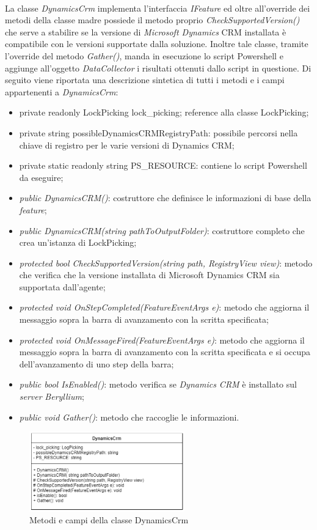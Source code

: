 \\
La classe \emph{DynamicsCrm} implementa l'interfaccia \emph{IFeature} ed oltre all'override dei metodi della classe madre possiede il metodo proprio \emph{CheckSupportedVersion()} che serve a stabilire se la versione di \emph{Microsoft Dynamics} CRM installata è compatibile con le versioni supportate dalla soluzione. 
Inoltre tale classe, tramite l'override del metodo \emph{Gather()}, manda in esecuzione lo script Powershell e aggiunge all'oggetto \emph{DataCollector} i risultati  ottenuti dallo script in questione.
Di seguito viene riportata una descrizione sintetica di tutti i metodi e i campi appartenenti a \emph{DynamicsCrm}:
\begin{itemize}
    \item private readonly LockPicking lock\_picking; reference alla classe LockPicking;
    \item private string possibleDynamicsCRMRegistryPath: possibile percorsi nella chiave di registro per le varie versioni di Dynamics CRM;
    \item private static readonly string PS\_RESOURCE: contiene lo script Powershell da eseguire;
    \item \textit{public DynamicsCRM()}: costruttore che definisce le informazioni di base della \emph{feature};
    \item \textit{public DynamicsCRM(string pathToOutputFolder)}: costruttore completo che crea un’istanza di LockPicking;
    \item \textit{protected bool CheckSupportedVersion(string path, RegistryView view)}: metodo che verifica che la versione installata di Microsoft Dynamics CRM sia supportata dall’agente;
    \item \textit{protected void OnStepCompleted(FeatureEventArgs e)}: metodo che aggiorna il messaggio sopra la barra di avanzamento con la scritta specificata;
    \item \textit{protected void OnMessageFired(FeatureEventArgs e)}: metodo che aggiorna il messaggio sopra la barra di avanzamento con la scritta specificata e si occupa dell’avanzamento di uno step della barra;
    \item \textit{public bool IsEnabled()}: metodo verifica se \emph{Dynamics CRM} è installato sul \emph{server} \emph{Beryllium};
    \item \textit{public void Gather()}: metodo che raccoglie le informazioni.
\end{itemize}
\begin{figure}[H]
\centering
\captionsetup{justification=centering,margin=2cm}
\includegraphics[width=0.6\textwidth ]{figures/dynamicscrm.png}
\caption [Metodi e campi della classe DynamicsCrm]{Metodi e campi della classe DynamicsCrm \label{fig:dynamicsCrm}}
\end{figure}

